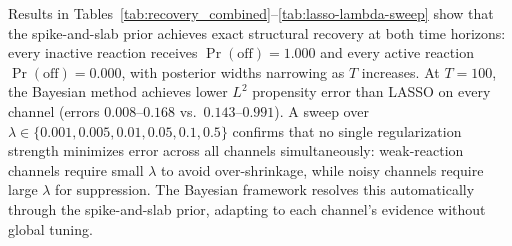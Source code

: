 Results in Tables~\ref{tab:recovery_combined}--\ref{tab:lasso-lambda-sweep} show that the spike-and-slab prior achieves exact structural recovery at both time horizons: every inactive reaction receives $\Pr(\text{off})=1.000$ and every active reaction $\Pr(\text{off})=0.000$, with posterior widths narrowing as $T$ increases. At $T=100$, the Bayesian method achieves lower $L^2$ propensity error than LASSO on every channel (errors $0.008$--$0.168$ vs.\ $0.143$--$0.991$). A sweep over $\lambda\in\{0.001,0.005,0.01,0.05,0.1,0.5\}$ confirms that no single regularization strength minimizes error across all channels simultaneously: weak-reaction channels require small $\lambda$ to avoid over-shrinkage, while noisy channels require large $\lambda$ for suppression. The Bayesian framework resolves this automatically through the spike-and-slab prior, adapting to each channel's evidence without global tuning.












